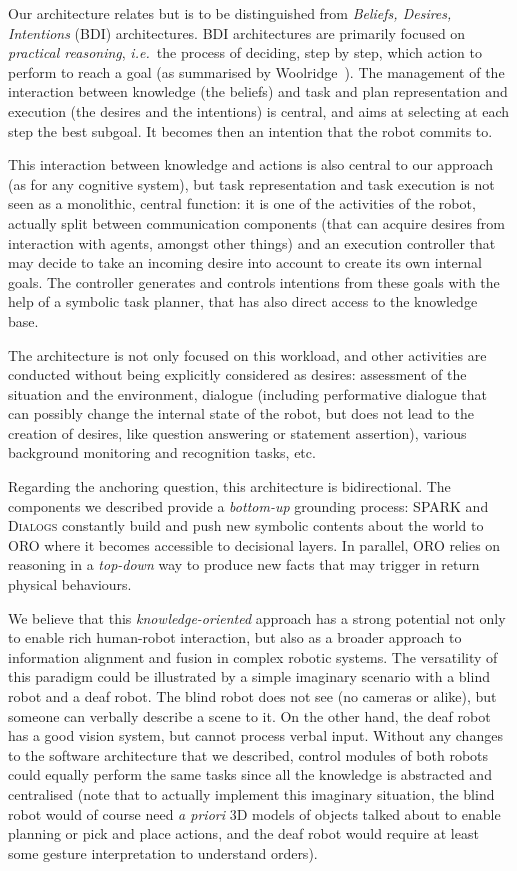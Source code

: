 \documentclass[letterpaper, 10 pt, conference]{ieeeconf}  %
\newcommand{\ie}{{\textit{i.e.\ }}}
\begin{document}
Our architecture relates but is to be distinguished from \emph{Beliefs,
Desires, Intentions} (BDI) architectures. BDI architectures are primarily
focused on \emph{practical reasoning}, \ie the process of deciding, step by
step, which action to perform to reach a goal (as summarised by
Woolridge~\cite{Woolridge1999}). The management of the interaction between
knowledge (the beliefs) and task and plan representation and execution (the
desires and the intentions) is central, and aims at selecting at each step the
best subgoal. It becomes then an intention that the robot commits to.

This interaction between knowledge and actions is also central to our approach
(as for any cognitive system), but task representation and task execution is
not seen as a monolithic, central function: it is one of the activities of the
robot, actually split between communication components (that can acquire
desires from interaction with agents, amongst other things) and an execution
controller that may decide to take an incoming desire into account to create
its own internal goals. The controller generates and controls intentions from
these goals with the help of a symbolic task planner, that has also direct
access to the knowledge base.

The architecture is not only focused on this workload, and other
activities are conducted without being explicitly considered as desires:
assessment of the situation and the environment, dialogue (including
performative dialogue that can possibly change the internal state of the robot,
but does not lead to the creation of desires,  like question answering or
statement assertion), various background monitoring and recognition tasks, etc.

Regarding the anchoring question, this architecture is bidirectional. The
components we described provide a \textit{bottom-up} grounding process: SPARK
and \textsc{Dialogs} constantly build and push new symbolic contents about the
world to ORO where it becomes accessible to decisional layers. In parallel, ORO
relies on reasoning in a \textit{top-down} way to produce new facts that may
trigger in return physical behaviours. 

We believe that this \emph{knowledge-oriented} approach has a strong potential
not only to enable rich human-robot interaction, but also as a broader approach
to information alignment and fusion in complex robotic systems.  The
versatility of this paradigm could be illustrated by a simple imaginary
scenario with a blind robot and a deaf robot. The blind robot does not see (no
cameras or alike), but someone can verbally describe a scene to it. On the
other hand, the deaf robot has a good vision system, but cannot process verbal
input.  Without any changes to the software architecture that we described,
control modules of both robots could equally perform the same tasks since all
the knowledge is abstracted and centralised (note that to actually implement
this imaginary situation, the blind robot would of course need \textit{a
priori} 3D models of objects talked about to enable planning or pick and place
actions, and the deaf robot would require at least some gesture interpretation
to understand orders).
\end{document}
